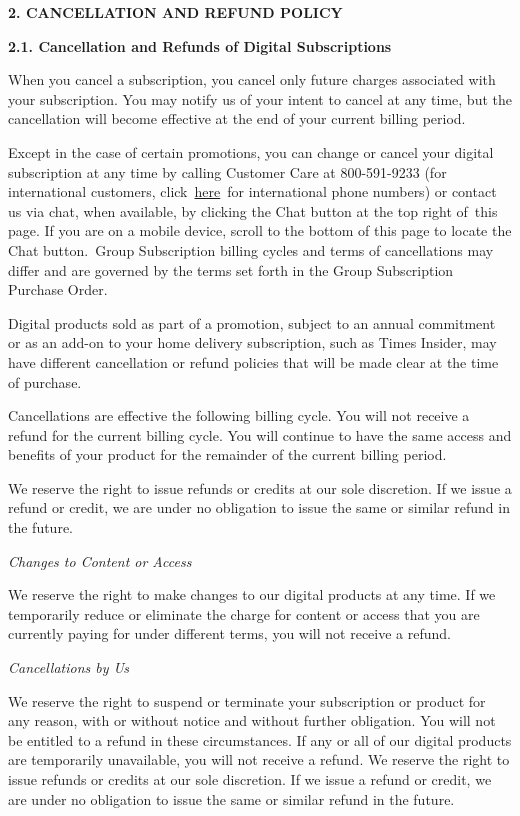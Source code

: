 \textbf{2. CANCELLATION AND REFUND POLICY}

\textbf{2.1. Cancellation and Refunds of Digital Subscriptions}

When you cancel a subscription, you cancel only future charges
associated with your subscription. You may notify us of your intent to
cancel at any time, but the cancellation will become effective at the
end of your current billing period.~

Except in the case of certain promotions, you can change or cancel your
digital subscription at any time by calling Customer Care at
800-591-9233 (for international customers,
click~\href{https://help.nytimes3xbfgragh.onion/hc/en-us/articles/115014792927}{here}~for
international phone numbers) or contact us via chat, when available, by
clicking the Chat button at the top right of~this page. If you are on a
mobile device, scroll to the bottom of this page to locate the Chat
button.~Group Subscription billing cycles and terms of cancellations may
differ and are governed by the terms set forth in the Group Subscription
Purchase Order.

Digital products sold as part of a promotion, subject to an annual
commitment or as an add-on to your home delivery subscription, such as
Times Insider, may have different cancellation or refund policies that
will be made clear at the time of purchase.

Cancellations are effective the following billing cycle. You will not
receive a refund for the current billing cycle. You will continue to
have the same access and benefits of your product for the remainder of
the current billing period.

We reserve the right to issue refunds or credits at our sole discretion.
If we issue a refund or credit, we are under no obligation to issue the
same or similar refund in the future.

\emph{Changes to Content or Access}

We reserve the right to make changes to our digital products at any
time. If we temporarily reduce or eliminate the charge for content or
access that you are currently paying for under different terms, you will
not receive a refund.

\emph{Cancellations by Us}

We reserve the right to suspend or terminate your subscription or
product for any reason, with or without notice and without further
obligation. You will not be entitled to a refund in these circumstances.
If any or all of our digital products are temporarily unavailable, you
will not receive a refund. We reserve the right to issue refunds or
credits at our sole discretion. If we issue a refund or credit, we are
under no obligation to issue the same or similar refund in the future.

